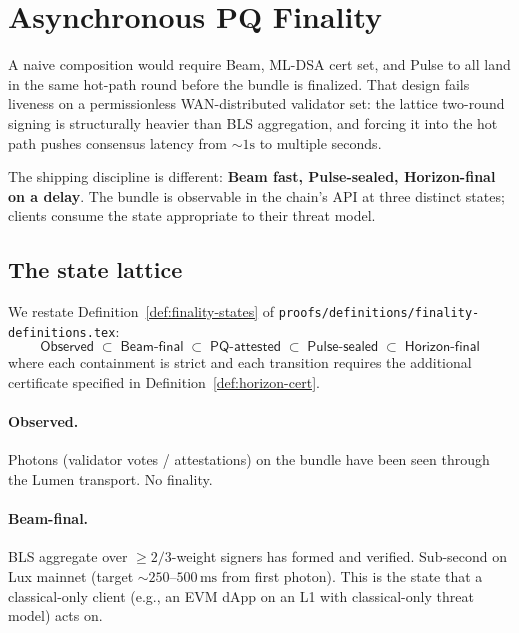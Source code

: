 \section{Asynchronous PQ Finality}
\label{sec:async-pq-finality}

A naive composition would require Beam, ML-DSA cert set, and Pulse to all land in the same hot-path round before the bundle is finalized. That design fails liveness on a permissionless WAN-distributed validator set: the lattice two-round signing is structurally heavier than BLS aggregation, and forcing it into the hot path pushes consensus latency from $\sim 1\mathrm{s}$ to multiple seconds.

The shipping discipline is different: \textbf{Beam fast, Pulse-sealed, Horizon-final on a delay}. The bundle is observable in the chain's API at three distinct states; clients consume the state appropriate to their threat model.

\subsection{The state lattice}

We restate Definition~\ref{def:finality-states} of \texttt{proofs/definitions/finality-definitions.tex}:
\begin{equation}
  \mathsf{Observed} \;\subset\; \mathsf{Beam\text{-}final}
   \;\subset\; \mathsf{PQ\text{-}attested}
   \;\subset\; \mathsf{Pulse\text{-}sealed}
   \;\subset\; \mathsf{Horizon\text{-}final}
\end{equation}
where each containment is strict and each transition requires the additional certificate specified in Definition~\ref{def:horizon-cert}.

\paragraph{Observed.} Photons (validator votes / attestations) on the bundle have been seen through the Lumen transport. No finality.

\paragraph{Beam-final.} BLS aggregate over $\geq 2/3$-weight signers has formed and verified. Sub-second on Lux mainnet (target $\sim 250$--$500\,\mathrm{ms}$ from first photon). This is the state that a classical-only client (e.g., an EVM dApp on an L1 with classical-only threat model) acts on.

